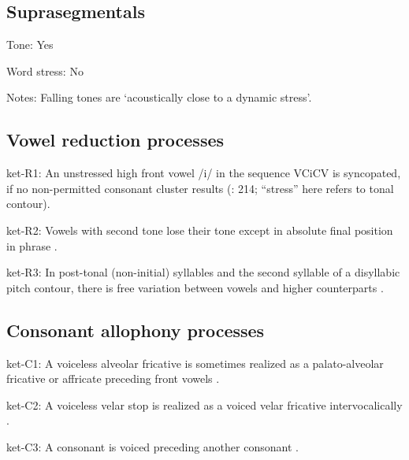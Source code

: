 {\subsection*{Suprasegmentals}
\begin{appendixdesc}
\item[Tone:] Yes

\item[Word stress:] No

\item[Notes:] Falling tones are ‘acoustically close to a dynamic stress’.
\end{appendixdesc}
\subsection*{Vowel reduction processes}
\begin{appendixdesc}

\item[ket-R1:] An unstressed high front vowel /i/ in the sequence VCiCV is syncopated, if no non-permitted consonant cluster results (\citealt{Georg2007}: 214; “stress” here refers to tonal contour).

\item[ket-R2:] Vowels with second tone lose their tone except in absolute final position in phrase \citep[15--16]{Vajda2000}.

\item[ket-R3:] In post-tonal (non-initial) syllables and the second syllable of a disyllabic pitch contour, there is free variation between vowels and higher counterparts \citep[11]{Vajda2000}.
\end{appendixdesc}
\subsection*{Consonant allophony processes}
\begin{appendixdesc}

\item[ket-C1:] A voiceless alveolar fricative is sometimes realized as a palato-alveolar fricative or affricate preceding front vowels \citep[78]{Georg2007}.

\item[ket-C2:] A voiceless velar stop is realized as a voiced velar fricative intervocalically \citep[75]{Georg2007}.

\item[ket-C3:] A consonant is voiced preceding another consonant \citep[75]{Georg2007}.


\end{appendixdesc}}
